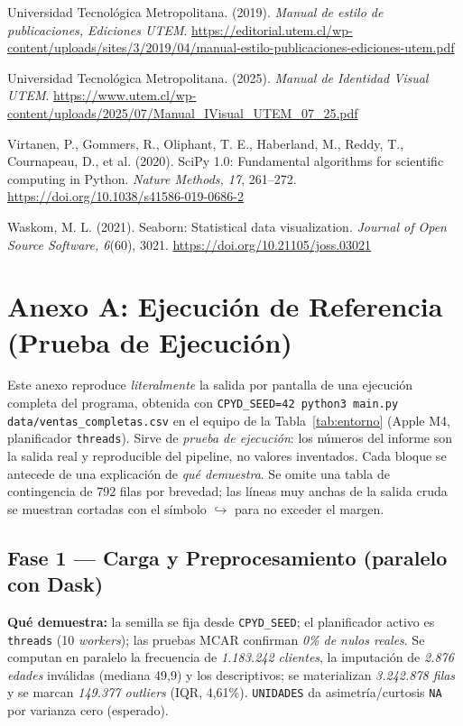 \documentclass[12pt,letterpaper]{article}
\begin{document}
{Universidad Tecnológica Metropolitana. (2019). \textit{Manual de estilo de publicaciones, Ediciones UTEM}. \url{https://editorial.utem.cl/wp-content/uploads/sites/3/2019/04/manual-estilo-publicaciones-ediciones-utem.pdf}\par
Universidad Tecnológica Metropolitana. (2025). \textit{Manual de Identidad Visual UTEM}. \url{https://www.utem.cl/wp-content/uploads/2025/07/Manual_IVisual_UTEM_07_25.pdf}\par
Virtanen, P., Gommers, R., Oliphant, T. E., Haberland, M., Reddy, T., Cournapeau, D., et al. (2020). SciPy 1.0: Fundamental algorithms for scientific computing in Python. \textit{Nature Methods, 17}, 261--272. \url{https://doi.org/10.1038/s41586-019-0686-2}\par
Waskom, M. L. (2021). Seaborn: Statistical data visualization. \textit{Journal of Open Source Software, 6}(60), 3021. \url{https://doi.org/10.21105/joss.03021}\par

}

\appendix
\section{Anexo A: Ejecución de Referencia (Prueba de Ejecución)}
\label{sec:anexo}
Este anexo reproduce \textit{literalmente} la salida por pantalla de una ejecución completa del
programa, obtenida con \texttt{CPYD\_SEED=42 python3 main.py data/ventas\_completas.csv} en el
equipo de la Tabla~\ref{tab:entorno} (Apple M4, planificador \texttt{threads}). Sirve de
\textit{prueba de ejecución}: los números del informe son la salida real y reproducible del
pipeline, no valores inventados. Cada bloque se antecede de una explicación de \textit{qué
demuestra}. Se omite una tabla de contingencia de 792 filas por brevedad; las líneas muy anchas de
la salida cruda se muestran cortadas con el símbolo $\hookrightarrow$ para no exceder el margen.

\subsection*{Fase 1 --- Carga y Preprocesamiento (paralelo con Dask)}
\textbf{Qué demuestra:} la semilla se fija desde \texttt{CPYD\_SEED}; el planificador activo es
\texttt{threads} (10 \textit{workers}); las pruebas MCAR confirman \textit{0\% de nulos reales}. Se
computan en paralelo la frecuencia de \textit{1.183.242 clientes}, la imputación de \textit{2.876
edades} inválidas (mediana 49,9) y los descriptivos; se materializan \textit{3.242.878 filas} y se
marcan \textit{149.377 outliers} (IQR, 4,61\%). \texttt{UNIDADES} da asimetría/curtosis \texttt{NA}
por varianza cero (esperado).
\end{document}
